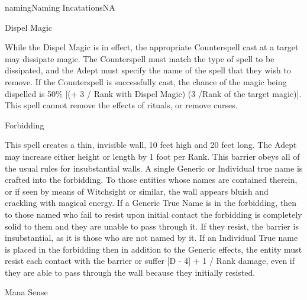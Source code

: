 \begin{College}[2.0]{naming}{Naming Incatations}{NA}
\begin{spell}[S-5]{Dispel Magic}

\begin{effects}
While the Dispel Magic is in effect, the appropriate Counterspell cast
at a target may dissipate magic. The Counterspell must match the type
of spell to be dissipated, and the Adept must specify the name of the
spell that they wish to remove.  If the Counterspell is successfully
cast, the chance of the magic being dispelled is 50\% [(+ 3 / Rank
  with Dispel Magic) (3 /Rank of the target magic)].  This spell
cannot remove the effects of rituals, or remove curses.

\end{effects}
\end{spell}

\begin{spell}[S-6]{Forbidding}

\begin{effects}
This spell creates a thin, invisible wall, 10 feet high and 20 feet
long. The Adept may increase either height or length by 1 foot per
Rank.  This barrier obeys all of the usual rules for insubstantial
walls.  A single Generic or Individual true name is crafted into the
forbidding. To those entities whose names are contained therein, or if
seen by means of Witchsight or similar, the wall appears bluish and
crackling with magical energy.  If a Generic True Name is in the
forbidding, then to those named who fail to resist upon initial
contact the forbidding is completely solid to them and they are unable
to pass through it.  If they resist, the barrier is insubstantial, as
it is those who are not named by it. If an Individual True name is
placed in the forbidding then in addition to the Generic effects, the
entity must resist each contact with the barrier or suffer [D - 4] + 1
/ Rank damage, even if they are able to pass through the wall because
they initially resisted.
\end{effects}
\end{spell}

\begin{spell}[S-7]{Mana Sense}


\end{spell}
\end{College}
